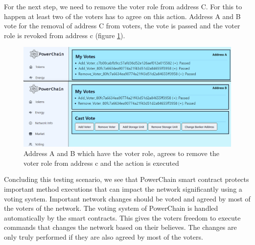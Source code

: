 For the next step, we need to remove the voter role from address C. For this to happen at least two of the voters has to agree
on this action. Address A and B vote for the removal of address C from voters, the vote is passed and the voter role is revoked from address c (figure \ref{fig:remove_voter}).\\ 
\begin{figure}[h!]
    \centering
    \includegraphics[width=\linewidth,frame,scale=0.7]{Figures/remove_voter.png}
    \caption{Address A and B which have the voter role, agrees to remove the voter role from address c and the action is executed}
    \label{fig:remove_voter}
\end{figure}
Concluding this testing scenario, we see that PowerChain smart contract protects important method executions that can impact the network significantly using
a voting system. Important network changes should be voted and agreed by most of the voters of the network. The voting system of PowerChain is handled automatically
by the smart contracts. This gives the voters freedom to execute commands that changes the network based on their believes. The changes are only truly performed if they 
are also agreed by most of the voters. \\

